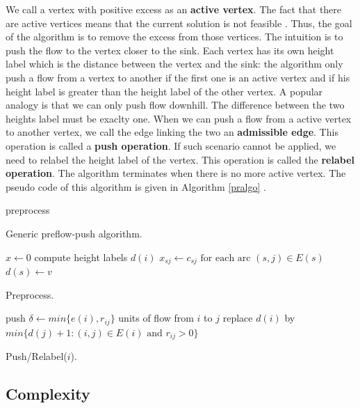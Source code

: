 We call a vertex with positive excess as an \textbf{active vertex}. The fact that there are active vertices means that the current solution is not feasible \cite{cormen}. Thus, the goal of the algorithm is to remove the excess from those vertices. The intuition is to push the flow to the vertex closer to the sink. Each vertex has its own height label which is the distance between the vertex and the sink: the algorithm only push a flow from a vertex to another if the first one is an active vertex and if his height label is greater than the height label of the other vertex. A popular analogy is that we can only push flow downhill. The difference between the two heights label must be exaclty one. When we can push a flow from a active vertex to another vertex, we call the edge linking the two an \textbf{admissible edge}. This operation is called a \textbf{push operation}. If such scenario cannot be applied, we need to relabel the height label of the vertex. This operation is called the \textbf{relabel operation}. The algorithm terminates when there is no more active vertex. The pseudo code of this algorithm is given in  Algorithm \ref{pralgo} \cite{networkflows}.


\begin{algorithm}
 preprocess\;
\caption{Generic preflow-push algorithm.}
\label{pralgo}
\end{algorithm}

\begin{algorithm}
 $x\gets 0$\;
 compute height labels $d(i)$\;
 $x_{sj}\gets c_{sj} \text{ for each arc } (s, j) \in E(s)$\;
 $d(s)\gets v$\;
\caption{Preprocess.}
\label{preprocess}
\end{algorithm}

\begin{algorithm}
  {push $\delta\gets min\{e(i), r_{ij}\}$ units of flow from $i$ to $j$\;}
\Else
   {replace $d(i)$ by $min\{d(j)+1 : (i, j) \in E(i) \text{ and } r_{ij} > 0 \}$\;}
\caption{Push/Relabel($i$).}
\end{algorithm}

\subsection{Complexity}

